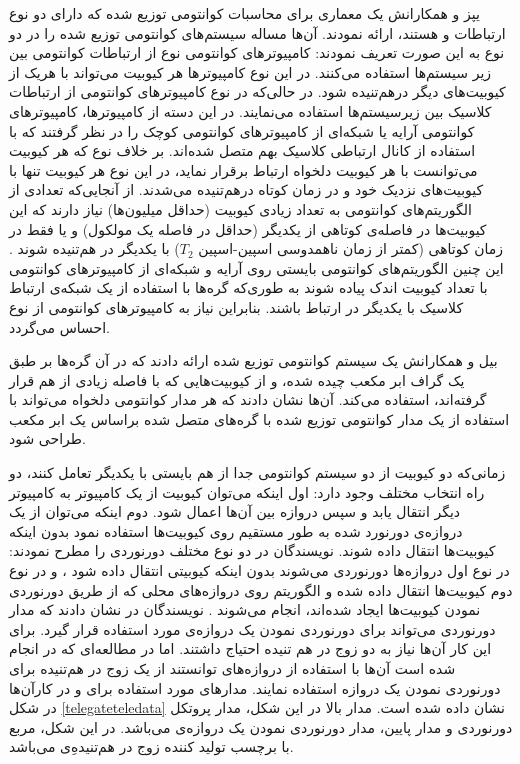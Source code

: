 یپز و همکارانش \cite{yepez2001type} یک معماری برای محاسبات کوانتومی توزیع شده که دارای دو نوع ارتباطات  و  هستند، ارائه نمودند. آن‌ها مساله سیستم‌های کوانتومی توزیع شده را در دو نوع به این صورت تعریف نمودند: کامپیوترهای کوانتومی نوع  از ارتباطات کوانتومی بین زیر سیستم‌ها استفاده می‌کنند. در این نوع کامپیوترها هر کیوبیت می‌تواند با هریک از کیوبیت‌های دیگر درهم‌تنیده شود. در حالی‌که در نوع  کامپیوترهای کوانتومی از ارتباطات کلاسیک بین زیرسیستم‌ها استفاده  می‌نمایند. در این دسته از کامپیوترها، کامپیوترهای کوانتومی آرایه‌ یا شبکه‌ای از کامپیوترهای کوانتومی کوچک را در نظر گرفتند که با استفاده از کانال ارتباطی کلاسیک بهم متصل شده‌اند. بر خلاف نوع   که هر کیوبیت می‌توانست با هر کیوبیت دلخواه ارتباط برقرار نماید، در این نوع هر کیوبیت تنها با کیوبیت‌های نزدیک خود و در زمان کوتاه درهم‌تنیده می‌شدند. 
از آنجایی‌که تعدادی از الگوریتم‌های کوانتومی به تعداد زیادی کیوبیت (حداقل میلیون‌ها) نیاز دارند که این کیوبیت‌ها در فاصله‌ی کوتاهی از یکدیگر (حداقل در فاصله یک مولکول) و یا فقط در زمان کوتاهی (کمتر از زمان ناهمدوسی اسپین-اسپین $T_2 $) با یکدیگر در هم‌تنیده شوند\cite{yepez1998quantum} \cite{yepez1998lattice}. این چنین الگوریتم‌های کوانتومی بایستی روی آرایه و شبکه‌ای از کامپیوترهای کوانتومی با تعداد کیوبیت اندک پیاده شوند به طوری‌که گره‌ها با استفاده از یک شبکه‌ی ارتباط کلاسیک با یکدیگر در ارتباط باشند. بنابراین نیاز به کامپیوترهای کوانتومی از نوع  احساس می‌گردد.

بیل و همکارانش \cite{Beals2013} یک سیستم کوانتومی توزیع شده ارائه دادند که در آن گره‌ها بر طبق یک گراف ابر مکعب چیده شده، و از کیوبیت‌هایی که با فاصله زیادی از هم قرار گرفته‌اند، استفاده می‌کند. آن‌ها نشان دادند که هر مدار کوانتومی دلخواه می‌تواند با استفاده از یک مدار کوانتومی توزیع شده با گره‌های متصل شده براساس یک ابر مکعب طراحی شود.


زمانی‌که دو کیوبیت از دو سیستم کوانتومی جدا از هم بایستی با یکدیگر تعامل کنند، دو راه انتخاب مختلف وجود دارد: اول اینکه می‌توان کیوبیت از یک کامپیوتر به کامپیوتر دیگر انتقال یابد و سپس دروازه بین آن‌ها اعمال شود. دوم اینکه می‌توان از یک دروازه‌ی دورنورد شده به طور مستقیم روی کیوبیت‌ها استفاده نمود بدون اینکه کیوبیت‌ها انتقال داده شوند. نویسندگان در \cite{meter} دو نوع مختلف دورنوردی را مطرح نمودند: در نوع اول دروازه‌ها دورنوردی می‌شوند بدون اینکه کیوبیتی انتقال داده شود ، و در نوع دوم کیوبیت‌ها انتقال داده شده و  الگوریتم روی دروازه‌های محلی که از طریق دورنوردی نمودن کیوبیت‌ها ایجاد شده‌اند، انجام می‌شوند . نویسندگان در \cite{gottesman1999demonstrating}  نشان دادند که مدار دورنوردی می‌تواند برای دورنوردی نمودن یک دروازه‌ی  مورد استفاده قرار گیرد. برای این کار آن‌ها نیاز به دو  زوج در هم تنیده احتیاج داشتند. اما در مطالعه‌ای که در \cite{meter} انجام شده است آن‌ها با استفاده از دروازه‌های  توانستند از یک زوج در هم‌تنیده برای دورنوردی نمودن یک دروازه استفاده نمایند. مدارهای مورد استفاده برای  و   در کارآن‌ها در شکل \ref{telegateteledata} نشان داده شده است. 
مدار بالا در این شکل، مدار پروتکل دورنوردی و مدار پایین، مدار دورنوردی نمودن یک دروازه‌‌ی  می‌باشد. در این شکل، مربع با برچسب  تولید کننده زوج در هم‌تنیدهِ‌ی  می‌باشد. 

